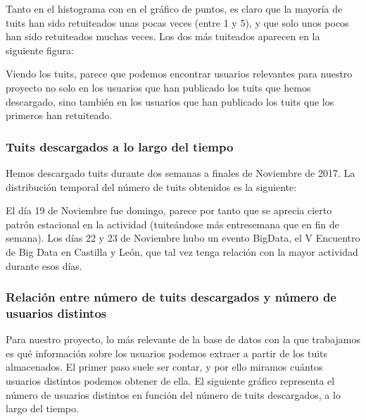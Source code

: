
Tanto en el histograma con en el gráfico de puntos, es claro que la mayoría de tuits han sido retuiteados unas pocas
veces (entre 1 y 5), y que solo unos pocos han sido retuiteados muchas veces. Los dos más tuiteados aparecen en la siguiente figura:


Viendo los tuits, parece que podemos encontrar usuarios relevantes para nuestro proyecto no solo en los usuarios que han publicado los tuits que hemos descargado, sino también en los usuarios que han publicado los tuits que los primeros han retuiteado.

\subsubsection{Tuits descargados a lo largo del tiempo}
Hemos descargado tuits durante dos semanas a finales de Noviembre de 2017. La distribución
temporal del número de tuits obtenidos es la siguiente:


El día 19 de Noviembre fue domingo, parece por tanto que se aprecia cierto patrón estacional en la actividad
(tuiteándose más entresemana que en fin de semana). Los días 22 y 23 de Noviembre hubo un evento
BigData, el V Encuentro de Big Data en Castilla y León, que tal vez tenga relación con la mayor actividad durante esos días.

\subsubsection{Relación entre número de tuits descargados y número de usuarios distintos}
Para nuestro proyecto, lo más relevante de la base de datos con la que trabajamos es
qué información sobre los usuarios podemos extraer a partir de los tuits almacenados. El primer paso suele ser contar, y por ello miramos cuántos usuarios distintos podemos obtener de ella. 
El siguiente gráfico representa el número de usuarios distintos en función del número de tuits
descargados, a lo largo del tiempo.

